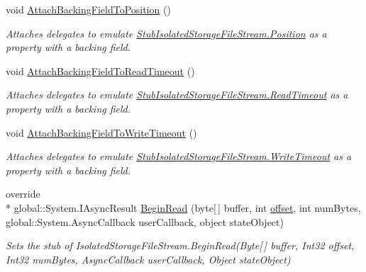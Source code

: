 \begin{DoxyCompactItemize}
void \hyperlink{class_system_1_1_i_o_1_1_isolated_storage_1_1_fakes_1_1_stub_isolated_storage_file_stream_a3d02b18f23ffebe2be05a918c5bd9ee8}{Attach\-Backing\-Field\-To\-Position} ()
\begin{DoxyCompactList}\small\item\em Attaches delegates to emulate \hyperlink{class_system_1_1_i_o_1_1_isolated_storage_1_1_fakes_1_1_stub_isolated_storage_file_stream_a81589ac682ae715452b9969d8b1061e2}{Stub\-Isolated\-Storage\-File\-Stream.\-Position} as a property with a backing field.\end{DoxyCompactList}\item 
void \hyperlink{class_system_1_1_i_o_1_1_isolated_storage_1_1_fakes_1_1_stub_isolated_storage_file_stream_ad51a279ae9f957d4849cdf2734c72f2d}{Attach\-Backing\-Field\-To\-Read\-Timeout} ()
\begin{DoxyCompactList}\small\item\em Attaches delegates to emulate \hyperlink{class_system_1_1_i_o_1_1_isolated_storage_1_1_fakes_1_1_stub_isolated_storage_file_stream_a26ef087c072dc9fcad70f36a10ea1f2a}{Stub\-Isolated\-Storage\-File\-Stream.\-Read\-Timeout} as a property with a backing field.\end{DoxyCompactList}\item 
void \hyperlink{class_system_1_1_i_o_1_1_isolated_storage_1_1_fakes_1_1_stub_isolated_storage_file_stream_a878c128fd656c51a81aa27f3b9a1d394}{Attach\-Backing\-Field\-To\-Write\-Timeout} ()
\begin{DoxyCompactList}\small\item\em Attaches delegates to emulate \hyperlink{class_system_1_1_i_o_1_1_isolated_storage_1_1_fakes_1_1_stub_isolated_storage_file_stream_ad086ecba5e15cf61cf85d4bfe4040c68}{Stub\-Isolated\-Storage\-File\-Stream.\-Write\-Timeout} as a property with a backing field.\end{DoxyCompactList}\item 
override \\*
global\-::\-System.\-I\-Async\-Result \hyperlink{class_system_1_1_i_o_1_1_isolated_storage_1_1_fakes_1_1_stub_isolated_storage_file_stream_a57f664a74adc8aa2e2926e1c0a060419}{Begin\-Read} (byte\mbox{[}$\,$\mbox{]} buffer, int \hyperlink{jquery-1_810_82_8js_a4a9f594d20d927164551fc7fa4751a2f}{offset}, int num\-Bytes, global\-::\-System.\-Async\-Callback user\-Callback, object state\-Object)
\begin{DoxyCompactList}\small\item\em Sets the stub of Isolated\-Storage\-File\-Stream.\-Begin\-Read(\-Byte\mbox{[}$\,$\mbox{]} buffer, Int32 offset, Int32 num\-Bytes, Async\-Callback user\-Callback, Object state\-Object)\end{DoxyCompactList}\item 

\end{DoxyCompactItemize}
